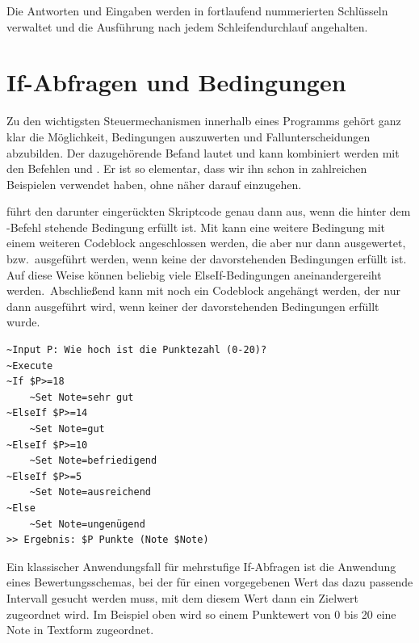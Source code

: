 Die Antworten und Eingaben werden in fortlaufend nummerierten Schlüsseln verwaltet und die Ausführung nach jedem Schleifendurchlauf angehalten. 

\section{If-Abfragen und Bedingungen}\label{IfUndBedingungen}
Zu den wichtigsten Steuermechanismen innerhalb eines Programms gehört ganz klar die Möglichkeit, Bedingungen auszuwerten und Fallunterscheidungen abzubilden.  Der dazugehörende Befand lautet  und kann kombiniert werden mit den Befehlen  und . Er ist so elementar, dass wir ihn schon in zahlreichen Beispielen verwendet haben, ohne näher darauf einzugehen.

 führt den darunter eingerückten Skriptcode genau dann aus, wenn die hinter dem -Befehl stehende Bedingung erfüllt ist. Mit  kann eine weitere Bedingung mit einem weiteren Codeblock angeschlossen werden, die aber nur dann ausgewertet, bzw.\ ausgeführt werden, wenn keine der davorstehenden Bedingungen erfüllt ist. Auf diese Weise können beliebig viele ElseIf-Bedingungen aneinandergereiht werden. Abschließend kann mit  noch ein Codeblock angehängt werden, der nur dann ausgeführt wird, wenn keiner der davorstehenden Bedingungen erfüllt wurde.

\label{BspBewertungsschema}
\begin{verbatim}
~Input P: Wie hoch ist die Punktezahl (0-20)?
~Execute
~If $P>=18
    ~Set Note=sehr gut
~ElseIf $P>=14
    ~Set Note=gut
~ElseIf $P>=10
    ~Set Note=befriedigend
~ElseIf $P>=5
    ~Set Note=ausreichend
~Else
    ~Set Note=ungenügend
>> Ergebnis: $P Punkte (Note $Note)
\end{verbatim}

Ein klassischer Anwendungsfall für mehrstufige If-Abfragen ist die Anwendung eines Bewertungsschemas, bei der für einen vorgegebenen Wert das dazu passende Intervall gesucht werden muss, mit dem diesem Wert dann ein Zielwert zugeordnet wird. Im Beispiel oben wird so einem Punktewert von 0 bis 20 eine Note in Textform zugeordnet.

